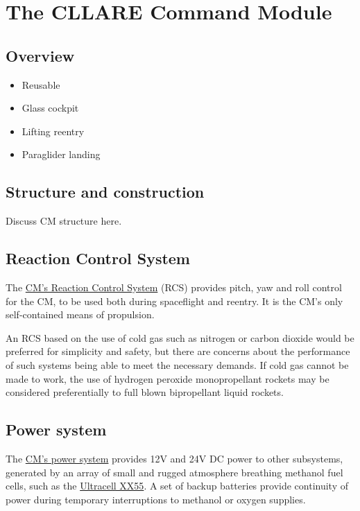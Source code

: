 \documentclass{report}
\begin{document}
\section{The CLLARE Command Module}

\subsection{Overview}

\begin{itemize}
\item Reusable
\item Glass cockpit
\item Lifting reentry
\item Paraglider landing
\end{itemize}

\subsection{Structure and construction}

Discuss CM structure here.

\subsection{Reaction Control System}

The \href{http://cstart.org/wiki/CLLARE_CM_Reaction_Control_System}{CM's Reaction Control System} (RCS) provides pitch, yaw and roll control for the CM, to be used both during spaceflight and reentry. It is the CM's only self-contained means of propulsion.

An RCS based on the use of cold gas such as nitrogen or carbon dioxide would be preferred for simplicity and safety, but there are concerns about the performance of such systems being able to meet the necessary demands.  If cold gas cannot be made to work, the use of hydrogen peroxide monopropellant rockets may be considered preferentially to full blown bipropellant liquid rockets.

\subsection{Power system}

The \href{http://cstart.org/wiki/CLLARE_CM_Power_System}{CM's power system} provides 12V and 24V DC power to other subsystems, generated by an array of small and rugged atmosphere breathing methanol fuel cells, such as the \href{http://www.ultracellpower.com/assets/XX55_Data_Sheet_01-27-2009.pdf}{Ultracell XX55}.  A set of backup batteries provide continuity of power during temporary interruptions to methanol or oxygen supplies.
\end{document}
